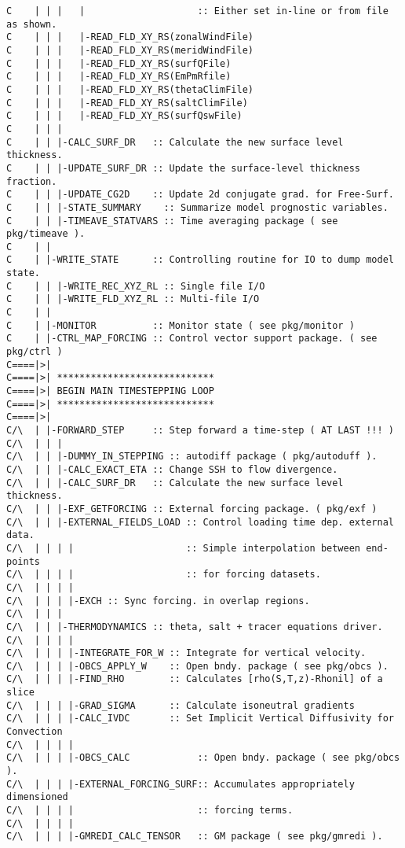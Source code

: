 \begin{verbatim}
C    | | |   |                    :: Either set in-line or from file as shown.
C    | | |   |-READ_FLD_XY_RS(zonalWindFile)
C    | | |   |-READ_FLD_XY_RS(meridWindFile)
C    | | |   |-READ_FLD_XY_RS(surfQFile)
C    | | |   |-READ_FLD_XY_RS(EmPmRfile)
C    | | |   |-READ_FLD_XY_RS(thetaClimFile)
C    | | |   |-READ_FLD_XY_RS(saltClimFile)
C    | | |   |-READ_FLD_XY_RS(surfQswFile)
C    | | |
C    | | |-CALC_SURF_DR   :: Calculate the new surface level thickness.
C    | | |-UPDATE_SURF_DR :: Update the surface-level thickness fraction.
C    | | |-UPDATE_CG2D    :: Update 2d conjugate grad. for Free-Surf.
C    | | |-STATE_SUMMARY    :: Summarize model prognostic variables.
C    | | |-TIMEAVE_STATVARS :: Time averaging package ( see pkg/timeave ).
C    | |
C    | |-WRITE_STATE      :: Controlling routine for IO to dump model state.
C    | | |-WRITE_REC_XYZ_RL :: Single file I/O
C    | | |-WRITE_FLD_XYZ_RL :: Multi-file I/O
C    | | 
C    | |-MONITOR          :: Monitor state ( see pkg/monitor )
C    | |-CTRL_MAP_FORCING :: Control vector support package. ( see pkg/ctrl )
C====|>| 
C====|>| ****************************
C====|>| BEGIN MAIN TIMESTEPPING LOOP
C====|>| ****************************
C====|>| 
C/\  | |-FORWARD_STEP     :: Step forward a time-step ( AT LAST !!! )
C/\  | | |
C/\  | | |-DUMMY_IN_STEPPING :: autodiff package ( pkg/autoduff ).
C/\  | | |-CALC_EXACT_ETA :: Change SSH to flow divergence.
C/\  | | |-CALC_SURF_DR   :: Calculate the new surface level thickness.
C/\  | | |-EXF_GETFORCING :: External forcing package. ( pkg/exf )
C/\  | | |-EXTERNAL_FIELDS_LOAD :: Control loading time dep. external data.
C/\  | | | |                    :: Simple interpolation between end-points 
C/\  | | | |                    :: for forcing datasets.
C/\  | | | |                  
C/\  | | | |-EXCH :: Sync forcing. in overlap regions.
C/\  | | |
C/\  | | |-THERMODYNAMICS :: theta, salt + tracer equations driver.
C/\  | | | |
C/\  | | | |-INTEGRATE_FOR_W :: Integrate for vertical velocity.
C/\  | | | |-OBCS_APPLY_W    :: Open bndy. package ( see pkg/obcs ).
C/\  | | | |-FIND_RHO        :: Calculates [rho(S,T,z)-Rhonil] of a slice
C/\  | | | |-GRAD_SIGMA      :: Calculate isoneutral gradients
C/\  | | | |-CALC_IVDC       :: Set Implicit Vertical Diffusivity for Convection
C/\  | | | |
C/\  | | | |-OBCS_CALC            :: Open bndy. package ( see pkg/obcs ).
C/\  | | | |-EXTERNAL_FORCING_SURF:: Accumulates appropriately dimensioned 
C/\  | | | |                      :: forcing terms.
C/\  | | | |
C/\  | | | |-GMREDI_CALC_TENSOR   :: GM package ( see pkg/gmredi ).

\end{verbatim}
